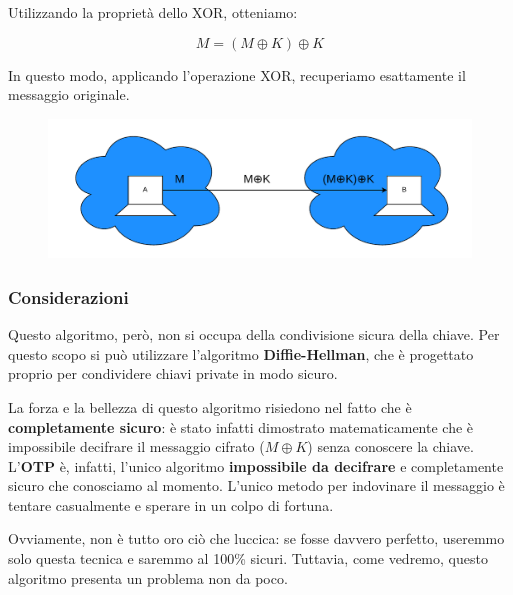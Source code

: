 \documentclass{rapport}
\begin{document}
Utilizzando la proprietà dello XOR, otteniamo:  

\begin{equation*}
    M = (M \oplus K) \oplus K 
\end{equation*}

In questo modo, applicando l'operazione XOR, recuperiamo esattamente il messaggio originale.  














\begin{figure}[h]
    \centering
    \includegraphics[width=0.9\linewidth]{logos/crit5.pdf}
\end{figure}


\subsubsection{Considerazioni}

Questo algoritmo, però, non si occupa della condivisione sicura della chiave. Per questo scopo si può utilizzare l'algoritmo \textbf{Diffie-Hellman}, che è progettato proprio per condividere chiavi private in modo sicuro.  

La forza e la bellezza di questo algoritmo risiedono nel fatto che è \textbf{completamente sicuro}: è stato infatti dimostrato matematicamente che è impossibile decifrare il messaggio cifrato (\(M \oplus K\)) senza conoscere la chiave. L'\textbf{OTP} è, infatti, l'unico algoritmo \textbf{impossibile da decifrare} e completamente sicuro che conosciamo al momento. L'unico metodo per indovinare il messaggio è tentare casualmente e sperare in un colpo di fortuna.  

Ovviamente, non è tutto oro ciò che luccica: se fosse davvero perfetto, useremmo solo questa tecnica e saremmo al 100\% sicuri. Tuttavia, come vedremo, questo algoritmo presenta un problema non da poco.  
\end{document}
